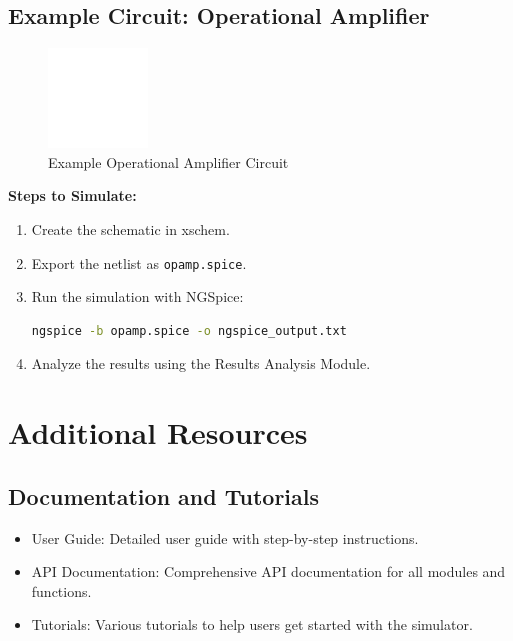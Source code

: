 \documentclass[12pt]{article}
\begin{document}
\subsection{Example Circuit: Operational Amplifier}
\begin{figure}[htbp]
\centering
\includegraphics[width=0.8\linewidth]{example_circuit_opamp.png}
\caption{Example Operational Amplifier Circuit}
\label{fig:opamp}
\end{figure}

\textbf{Steps to Simulate:}
\begin{enumerate}
    \item Create the schematic in xschem.
    \item Export the netlist as \texttt{opamp.spice}.
    \item Run the simulation with NGSpice:
    \begin{lstlisting}[language=bash, breaklines=true]
    ngspice -b opamp.spice -o ngspice_output.txt
    \end{lstlisting}
    \item Analyze the results using the Results Analysis Module.
\end{enumerate}

\section{Additional Resources}
\subsection{Documentation and Tutorials}
\begin{itemize}
    \item User Guide: Detailed user guide with step-by-step instructions.
    \item API Documentation: Comprehensive API documentation for all modules and functions.
    \item Tutorials: Various tutorials to help users get started with the simulator.
\end{itemize}
\end{document}
